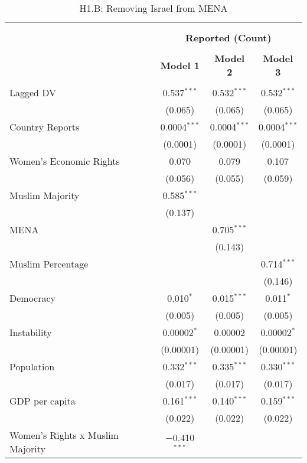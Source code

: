 
\begin{table}[!htbp] \centering 
  \caption{H1.B: Removing Israel from MENA} 
  \label{} 
\begin{tabular}{@{\extracolsep{5pt}}lccc} 
\\[-1.8ex]\hline \\[-1.8ex] 
\\[-1.8ex] & \multicolumn{3}{c}{\textbf{Reported (Count)}} \\ 
\\[-1.8ex] & \textbf{Model 1} & \textbf{Model 2} & \textbf{Model 3}\\ 
\hline \\[-1.8ex] 
 Lagged DV & 0.537$^{***}$ & 0.532$^{***}$ & 0.532$^{***}$ \\ 
  & (0.065) & (0.065) & (0.065) \\ 
  Country Reports & 0.0004$^{***}$ & 0.0004$^{***}$ & 0.0004$^{***}$ \\ 
  & (0.0001) & (0.0001) & (0.0001) \\ 
  Women's Economic Rights & 0.070 & 0.079 & 0.107 \\ 
  & (0.056) & (0.055) & (0.059) \\ 
  Muslim Majority & 0.585$^{***}$ &  &  \\ 
  & (0.137) &  &  \\ 
  MENA &  & 0.705$^{***}$ &  \\ 
  &  & (0.143) &  \\ 
  Muslim Percentage &  &  & 0.714$^{***}$ \\ 
  &  &  & (0.146) \\ 
  Democracy & 0.010$^{*}$ & 0.015$^{***}$ & 0.011$^{*}$ \\ 
  & (0.005) & (0.005) & (0.005) \\ 
  Instability & 0.00002$^{*}$ & 0.00002 & 0.00002$^{*}$ \\ 
  & (0.00001) & (0.00001) & (0.00001) \\ 
  Population & 0.332$^{***}$ & 0.335$^{***}$ & 0.330$^{***}$ \\ 
  & (0.017) & (0.017) & (0.017) \\ 
  GDP per capita & 0.161$^{***}$ & 0.140$^{***}$ & 0.159$^{***}$ \\ 
  & (0.022) & (0.022) & (0.022) \\ 
  Women's Rights x Muslim Majority & $-$0.410$^{***}$ &  &  \\ 

\end{tabular}
\end{table}
